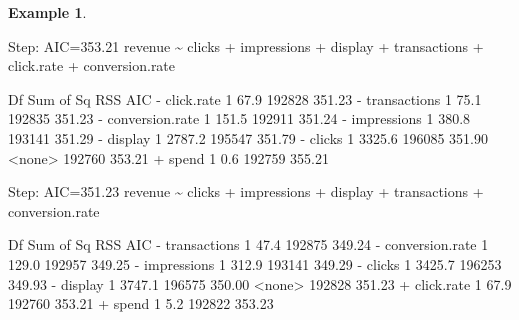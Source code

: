 \documentclass[
  11pt,
]{book}
\makeatletter
\newenvironment{Shaded}{}{}
\newcommand{\DecValTok}[1]{#1}
\newcommand{\FloatTok}[1]{#1}
\newcommand{\NormalTok}[1]{#1}
\newcommand{\OtherTok}[1]{\textcolor[rgb]{0.39,0.39,0.39}{#1}}
\newcommand{\SpecialCharTok}[1]{\textcolor[rgb]{0.39,0.39,0.39}{#1}}
\newenvironment{kframe}{%
\medskip{}
\setlength{\fboxsep}{.8em}
 \def\at@end@of@kframe{}%
 \ifinner\ifhmode%
  \def\at@end@of@kframe{\end{minipage}}%
  \begin{minipage}{\columnwidth}%
 \fi\fi%
 \def\FrameCommand##1{\hskip\@totalleftmargin \hskip-\fboxsep
 \colorbox{shadecolor}{##1}\hskip-\fboxsep
     \hskip-\linewidth \hskip-\@totalleftmargin \hskip\columnwidth}%
 \MakeFramed {\advance\hsize-\width
   \@totalleftmargin\z@ \linewidth\hsize
   \@setminipage}}%
 {\par\unskip\endMakeFramed%
 \at@end@of@kframe}
\renewenvironment{Shaded}{\begin{kframe}}{\end{kframe}}
\theoremstyle{definition}
\theoremstyle{definition}
\newtheorem{example}{Example}[chapter]
\theoremstyle{definition}
\theoremstyle{definition}
\theoremstyle{remark}
\makeatother
\begin{document}
\begin{example}
\begin{Shaded}
\begin{Highlighting}[]
\NormalTok{   Step}\SpecialCharTok{:}\NormalTok{  AIC}\OtherTok{=}\FloatTok{353.21}
\NormalTok{   revenue }\SpecialCharTok{\textasciitilde{}}\NormalTok{ clicks }\SpecialCharTok{+}\NormalTok{ impressions }\SpecialCharTok{+}\NormalTok{ display }\SpecialCharTok{+}\NormalTok{ transactions }\SpecialCharTok{+}\NormalTok{ click.rate }\SpecialCharTok{+} 
\NormalTok{       conversion.rate}
   
\NormalTok{                     Df Sum of Sq    RSS    AIC}
   \SpecialCharTok{{-}}\NormalTok{ click.rate       }\DecValTok{1}      \FloatTok{67.9} \DecValTok{192828} \FloatTok{351.23}
   \SpecialCharTok{{-}}\NormalTok{ transactions     }\DecValTok{1}      \FloatTok{75.1} \DecValTok{192835} \FloatTok{351.23}
   \SpecialCharTok{{-}}\NormalTok{ conversion.rate  }\DecValTok{1}     \FloatTok{151.5} \DecValTok{192911} \FloatTok{351.24}
   \SpecialCharTok{{-}}\NormalTok{ impressions      }\DecValTok{1}     \FloatTok{380.8} \DecValTok{193141} \FloatTok{351.29}
   \SpecialCharTok{{-}}\NormalTok{ display          }\DecValTok{1}    \FloatTok{2787.2} \DecValTok{195547} \FloatTok{351.79}
   \SpecialCharTok{{-}}\NormalTok{ clicks           }\DecValTok{1}    \FloatTok{3325.6} \DecValTok{196085} \FloatTok{351.90}
   \SpecialCharTok{\textless{}}\NormalTok{none}\SpecialCharTok{\textgreater{}}                         \DecValTok{192760} \FloatTok{353.21}
   \SpecialCharTok{+}\NormalTok{ spend            }\DecValTok{1}       \FloatTok{0.6} \DecValTok{192759} \FloatTok{355.21}
   
\NormalTok{   Step}\SpecialCharTok{:}\NormalTok{  AIC}\OtherTok{=}\FloatTok{351.23}
\NormalTok{   revenue }\SpecialCharTok{\textasciitilde{}}\NormalTok{ clicks }\SpecialCharTok{+}\NormalTok{ impressions }\SpecialCharTok{+}\NormalTok{ display }\SpecialCharTok{+}\NormalTok{ transactions }\SpecialCharTok{+}\NormalTok{ conversion.rate}
   
\NormalTok{                     Df Sum of Sq    RSS    AIC}
   \SpecialCharTok{{-}}\NormalTok{ transactions     }\DecValTok{1}      \FloatTok{47.4} \DecValTok{192875} \FloatTok{349.24}
   \SpecialCharTok{{-}}\NormalTok{ conversion.rate  }\DecValTok{1}     \FloatTok{129.0} \DecValTok{192957} \FloatTok{349.25}
   \SpecialCharTok{{-}}\NormalTok{ impressions      }\DecValTok{1}     \FloatTok{312.9} \DecValTok{193141} \FloatTok{349.29}
   \SpecialCharTok{{-}}\NormalTok{ clicks           }\DecValTok{1}    \FloatTok{3425.7} \DecValTok{196253} \FloatTok{349.93}
   \SpecialCharTok{{-}}\NormalTok{ display          }\DecValTok{1}    \FloatTok{3747.1} \DecValTok{196575} \FloatTok{350.00}
   \SpecialCharTok{\textless{}}\NormalTok{none}\SpecialCharTok{\textgreater{}}                         \DecValTok{192828} \FloatTok{351.23}
   \SpecialCharTok{+}\NormalTok{ click.rate       }\DecValTok{1}      \FloatTok{67.9} \DecValTok{192760} \FloatTok{353.21}
   \SpecialCharTok{+}\NormalTok{ spend            }\DecValTok{1}       \FloatTok{5.2} \DecValTok{192822} \FloatTok{353.23}
   

\end{Highlighting}
\end{Shaded}
\end{example}
\end{document}
